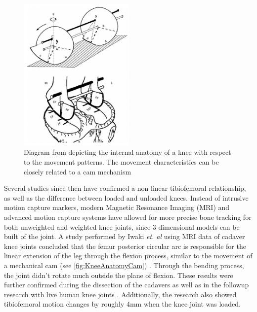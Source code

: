 \begin{figure}[ht!]
    \centering
    \includegraphics[width=0.5\textwidth]{Figures/Background/KneeAnatomy1.png}
    \caption{Diagram from \cite{MRIKneeShape_Unloaded} depicting the internal anatomy of a knee with respect to the movement patterns. The movement characteristics can be closely related to a cam mechanism}
    \label{fig:KneeAnatomyCam}
\end{figure}

Several studies since then have confirmed a non-linear tibiofemoral relationship, as well as the difference between loaded and unloaded knees. Instead of intrusive motion capture markers, modern Magnetic Resonance Imaging (MRI) and advanced motion capture systems \cite{ModelAnalysisDeepKneeFlexion} have allowed for more precise bone tracking for both unweighted and weighted knee joints, since 3 dimensional models can be built of the joint. A study performed by Iwaki \textit{et. al} using MRI data of cadaver knee joints concluded that the femur posterior circular arc is responsible for the linear extension of the leg through the flexion process, similar to the movement of a mechanical cam (see \autoref{fig:KneeAnatomyCam}) \cite{MRIKneeShape_Unloaded}. Through the bending process, the joint didn't rotate much outside the plane of flexion. These results were further confirmed during the dissection of the cadavers as well as in the followup research with live human knee joints \cite{MRIKneeShape_Loaded}. Additionally, the research also showed tibiofemoral motion changes by roughly 4mm when the knee joint was loaded.

